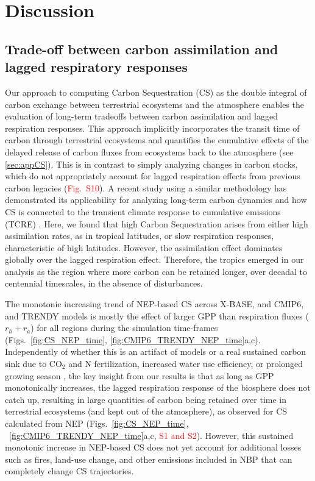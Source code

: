 \documentclass[ProofPDF]{./Styles/Jnls-Template-V3}
\begin{document}
\section{Discussion}
\subsection{Trade-off between carbon assimilation and lagged respiratory responses}
Our approach to computing Carbon Sequestration (CS) as the double integral of carbon exchange between terrestrial ecosystems and the atmosphere enables the evaluation of long-term tradeoffs between carbon assimilation and lagged respiration responses. This approach implicitly incorporates the transit time of carbon through terrestrial ecosystems and quantifies the cumulative effects of the delayed release of carbon fluxes from ecosystems back to the atmosphere (see \ref{sec:appCS}). This is in contrast to simply analyzing changes in carbon stocks, which do not appropriately account for lagged respiration effects from previous carbon legacies (\textcolor{red}{Fig.~S10}). A recent study using a similar methodology has demonstrated its applicability for analyzing long-term carbon dynamics and how CS is connected to the transient climate response to cumulative emissions (TCRE) \citep{Matthews2023}. Here, we found that high Carbon Sequestration arises from either high assimilation rates, as in tropical latitudes, or slow respiration responses, characteristic of high latitudes. However, the assimilation effect dominates globally over the lagged respiration effect. Therefore, the tropics emerged in our analysis as the region where more carbon can be retained longer, over decadal to centennial timescales, in the absence of disturbances. 

The monotonic increasing trend of NEP-based CS across X-BASE, and CMIP6, and TRENDY models is mostly the effect of larger GPP than respiration fluxes ($r_h+r_a$) for all regions during the simulation time-frames (Figs.~\ref{fig:CS_NEP_time}, \ref{fig:CMIP6_TRENDY_NEP_time}a,c). Independently of whether this is an artifact of models or a real sustained carbon sink due to CO$_2$ and N fertilization, increased water use efficiency, or prolonged growing season \citep{Fernandez-Martinez2017,Fernandez-Martinez2019,OSullivan2019,Friedlingstein2023,Ruehr2023}, the key insight from our results is that as long as GPP monotonically increases, the lagged respiration response of the biosphere does not catch up, resulting in large quantities of carbon being retained over time in terrestrial ecosystems (and kept out of the atmosphere), as observed for CS calculated from NEP (Figs.~\ref{fig:CS_NEP_time}, ~\ref{fig:CMIP6_TRENDY_NEP_time}a,c, \textcolor{red}{S1 and S2}). However, this sustained monotonic increase in NEP-based CS does not yet account for additional losses such as fires, land-use change, and other emissions included in NBP that can completely change CS trajectories.
\end{document}
